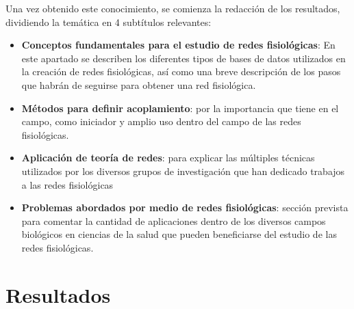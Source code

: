 \documentclass[twoside,twocolumn]{article}
\begin{document}
Una vez obtenido este conocimiento, se comienza la redacción de los resultados, dividiendo la temática en 4 subtítulos relevantes:
\begin{itemize}
  \item \textbf{Conceptos fundamentales para el estudio de redes fisiológicas}: En este apartado se describen los diferentes tipos de bases de datos utilizados en la creación de redes fisiológicas, así como una breve descripción de los pasos que habrán de seguirse para obtener una red fisiológica.
  \item \textbf{Métodos para definir acoplamiento}: por la importancia que tiene en el campo, como iniciador y amplio uso dentro del campo de las redes fisiológicas.
  \item \textbf{Aplicación de teoría de redes}: para explicar las múltiples técnicas utilizados por los diversos grupos de investigación que han dedicado trabajos a las redes fisiológicas
  \item \textbf{Problemas abordados por medio de redes fisiológicas}: sección prevista para comentar la cantidad de aplicaciones dentro de los diversos campos biológicos en ciencias de la salud que pueden beneficiarse del estudio de las redes fisiológicas.
\end{itemize}

\section{Resultados}
\end{document}
